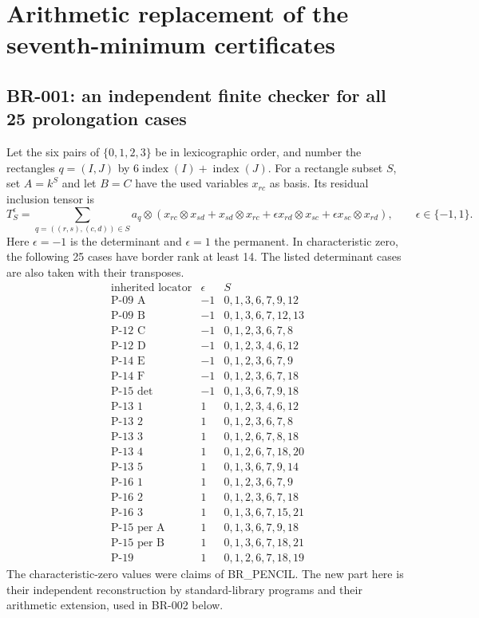 \section{Arithmetic replacement of the seventh-minimum certificates}

\subsection*{BR-001: an independent finite checker for all 25 prolongation cases}
Let the six pairs of $\{0,1,2,3\}$ be in lexicographic order, and number the
rectangles $q=(I,J)$ by $6\operatorname{index}(I)+\operatorname{index}(J)$.
For a rectangle subset $S$, set $A=k^S$ and let $B=C$ have the used variables
$x_{rc}$ as basis.  Its residual inclusion tensor is
\[
 T_S^\epsilon=\sum_{q=((r,s),(c,d))\in S}a_q\otimes
 (x_{rc}\otimes x_{sd}+x_{sd}\otimes x_{rc}
 +\epsilon x_{rd}\otimes x_{sc}+\epsilon x_{sc}\otimes x_{rd}),
 \qquad \epsilon\in\{-1,1\}.
\]
Here $\epsilon=-1$ is the determinant and $\epsilon=1$ the permanent.
In characteristic zero, the following 25 cases have border rank at least 14.  The listed determinant
cases are also taken with their transposes.
\[
\begin{array}{c|c|l}
\text{inherited locator}&\epsilon&S\\\hline
\text{P-09 A}&-1&0,1,3,6,7,9,12\\
\text{P-09 B}&-1&0,1,3,6,7,12,13\\
\text{P-12 C}&-1&0,1,2,3,6,7,8\\
\text{P-12 D}&-1&0,1,2,3,4,6,12\\
\text{P-14 E}&-1&0,1,2,3,6,7,9\\
\text{P-14 F}&-1&0,1,2,3,6,7,18\\
\text{P-15 det}&-1&0,1,3,6,7,9,18\\\hline
\text{P-13 1}&1&0,1,2,3,4,6,12\\
\text{P-13 2}&1&0,1,2,3,6,7,8\\
\text{P-13 3}&1&0,1,2,6,7,8,18\\
\text{P-13 4}&1&0,1,2,6,7,18,20\\
\text{P-13 5}&1&0,1,3,6,7,9,14\\
\text{P-16 1}&1&0,1,2,3,6,7,9\\
\text{P-16 2}&1&0,1,2,3,6,7,18\\
\text{P-16 3}&1&0,1,3,6,7,15,21\\
\text{P-15 per A}&1&0,1,3,6,7,9,18\\
\text{P-15 per B}&1&0,1,3,6,7,18,21\\
\text{P-19}&1&0,1,2,6,7,18,19
\end{array}
\]
The characteristic-zero values were claims of BR\_PENCIL.  The new part here
is their independent reconstruction by standard-library programs and their
arithmetic extension, used in BR-002 below.

